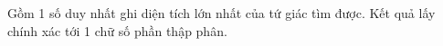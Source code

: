 Gồm 1 số duy nhất ghi diện tích lớn nhất của tứ giác tìm được. Kết quả lấy chính xác tới 1 chữ số phần thập phân.  

\